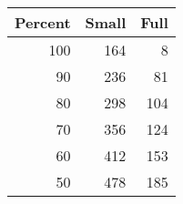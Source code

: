 
        \begin{tabular}{rrr}
        \toprule
        Percent & Small & Full \\
        \midrule
         100 &    164 &      8 \\
  90 &    236 &     81 \\
  80 &    298 &    104 \\
  70 &    356 &    124 \\
  60 &    412 &    153 \\
  50 &    478 &    185 \\

        \bottomrule
        \end{tabular}
        